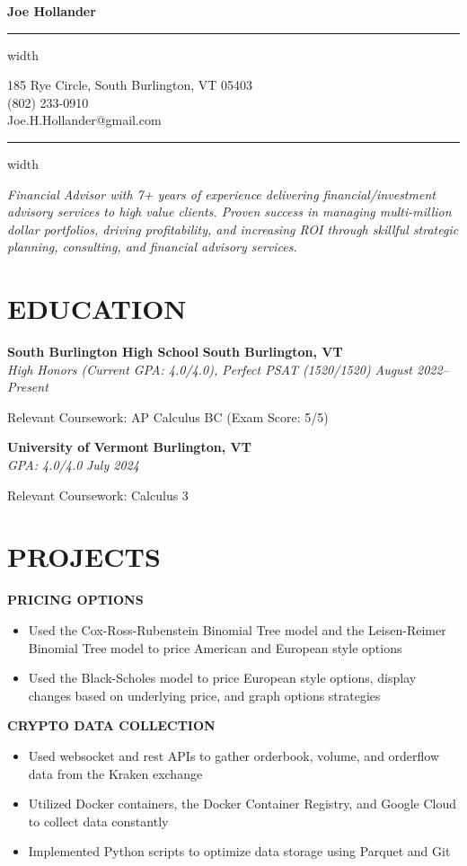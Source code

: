 \documentclass[11pt,letterpaper]{article}
\newcommand{\name}[1]{
  \begin{center}
    \Huge\textbf{#1}
  \end{center}
  \vspace{-0.5em}
  \hrule height 0.4pt width \textwidth
  \vspace{0.5em}
}
\newcommand{\contact}[3]{
  \begin{center}
    #1 \\
    #2 \\
    #3
  \end{center}
  \vspace{-0.5em}
  \hrule height 0.4pt width \textwidth
  \vspace{0.5em}
}
\newcommand{\role}[4]{
  \begin{center}
  \textbf{#1} \hfill \textbf{#2} \\
  \textit{#3} \hfill \textit{#4}
  \end{center}
}
\begin{document}
\name{Joe Hollander}
\vspace{-0.5em}
\contact{185 Rye Circle, South Burlington, VT 05403}{(802) 233-0910}{Joe.H.Hollander@gmail.com}

\vspace{-0.5em}
\begin{center}
\textit{Financial Advisor with 7+ years of experience delivering financial/investment advisory services to high value clients. Proven success in managing multi-million dollar portfolios, driving profitability, and increasing ROI through skillful strategic planning, consulting, and financial advisory services.}
\end{center}

\section{EDUCATION}

\vspace{0.5em}
\role{South Burlington High School}{South Burlington, VT}{High Honors (Current GPA: 4.0/4.0), Perfect PSAT (1520/1520)}{August 2022--Present}   
\begin{flushleft}
Relevant Coursework: AP Calculus BC (Exam Score: 5/5)
\end{flushleft}

\role{University of Vermont}{Burlington, VT}{GPA: 4.0/4.0}{July 2024}
\begin{flushleft}
  Relevant Coursework: Calculus 3
  \end{flushleft}

\section{PROJECTS}
\vspace{1em}
\begin{flushleft}
  \textbf{PRICING OPTIONS}
  \begin{itemize}[leftmargin=*,nosep]
    \item Used the Cox-Ross-Rubenstein Binomial Tree model and the Leisen-Reimer Binomial Tree model to price American and European style options
    \item Used the Black-Scholes model to price European style options, display changes based on underlying price, and graph options strategies
  \end{itemize}
\end{flushleft}


\begin{flushleft}
  \textbf{CRYPTO DATA COLLECTION}
  \begin{itemize}[leftmargin=*,nosep]
    \item Used websocket and rest APIs to gather orderbook, volume, and orderflow data from the Kraken exchange
    \item Utilized Docker containers, the Docker Container Registry, and Google Cloud to collect data constantly
    \item Implemented Python scripts to optimize data storage using Parquet and Git
  \end{itemize}
\end{flushleft}
\end{document}
